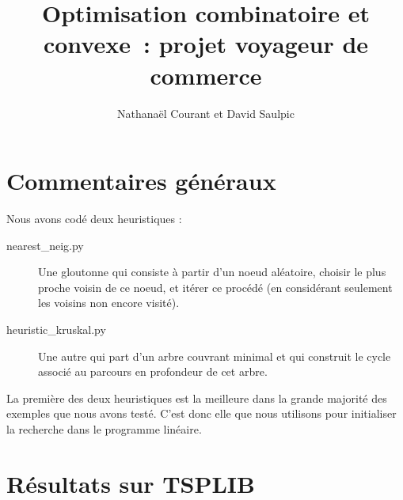 \documentclass[a4paper,10pt]{article}
\title{Optimisation combinatoire et convexe~: projet voyageur de commerce}
\author{Nathanaël Courant et David Saulpic}
\date{}
\begin{document}
\maketitle

\section{Commentaires généraux}
Nous avons codé deux heuristiques : 

\begin{description}
\item[nearest\_neig.py] Une gloutonne qui consiste à partir d'un noeud aléatoire, choisir le plus proche voisin de ce noeud, et itérer ce procédé (en considérant seulement les voisins non encore visité).

\item[heuristic\_kruskal.py] Une autre qui part d'un arbre couvrant minimal et qui construit le cycle associé au parcours en profondeur de cet arbre.

\end{description}
La première des deux heuristiques est la meilleure dans la grande majorité des exemples que nous avons testé. C'est donc elle que nous utilisons pour initialiser la recherche dans le programme linéaire.

\section{Résultats sur TSPLIB}
\end{document}
